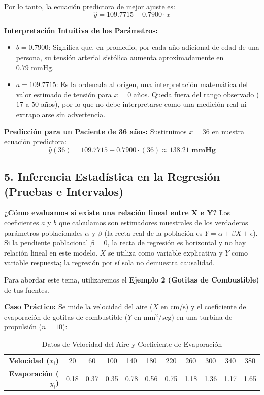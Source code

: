 \documentclass[11pt,a4paper]{article}
\begin{document}
    Por lo tanto, la ecuación predictora de mejor ajuste es:
    \[ \hat{y} = 109.7715 + 0.7900 \cdot x \]

    \textbf{Interpretación Intuitiva de los Parámetros:}
    \begin{itemize}
        \item $b = 0.7900$: Significa que, en promedio, por cada año adicional de edad de una persona, su tensión arterial sistólica aumenta aproximadamente en $0.79 \text{ mmHg}$.
        \item $a = 109.7715$: Es la ordenada al origen, una interpretación matemática del valor estimado de tensión para $x=0$ años. Queda fuera del rango observado ($17$ a $50$ años), por lo que no debe interpretarse como una medición real ni extrapolarse sin advertencia.
    \end{itemize}

    \textbf{Predicción para un Paciente de 36 años:}
    Sustituimos $x = 36$ en nuestra ecuación predictora:
    \[ \hat{y}(36) = 109.7715 + 0.7900 \cdot (36) \approx \mathbf{138.21 \text{ mmHg}} \]
 

\newpage
\subsection{5. Inferencia Estadística en la Regresión (Pruebas e Intervalos)}
    \textbf{¿Cómo evaluamos si existe una relación lineal entre X e Y?} \label{ej:evaporacion_completo}
    Los coeficientes $a$ y $b$ que calculamos son estimadores muestrales de los verdaderos parámetros poblacionales $\alpha$ y $\beta$ (la recta real de la población es $Y = \alpha + \beta X + \epsilon$). Si la pendiente poblacional $\beta = 0$, la recta de regresión es horizontal y no hay relación lineal en este modelo. $X$ se utiliza como variable explicativa y $Y$ como variable respuesta; la regresión por sí sola no demuestra causalidad.

    Para abordar este tema, utilizaremos el \textbf{Ejemplo 2 (Gotitas de Combustible)} de tus fuentes.
    
    \textbf{Caso Práctico:} Se mide la velocidad del aire ($X$ en $\text{cm/s}$) y el coeficiente de evaporación de gotitas de combustible ($Y$ en $\text{mm}^2\text{/seg}$) en una turbina de propulsión ($n = 10$):
    \begin{table}[h!]
        \centering
        \caption{Datos de Velocidad del Aire y Coeficiente de Evaporación}
        \begin{tabular}{rcccccccccc}
            \toprule
            \textbf{Velocidad ($x_i$)} & 20 & 60 & 100 & 140 & 180 & 220 & 260 & 300 & 340 & 380 \\
            \textbf{Evaporación ($y_i$)} & 0.18 & 0.37 & 0.35 & 0.78 & 0.56 & 0.75 & 1.18 & 1.36 & 1.17 & 1.65 \\
            \bottomrule
        \end{tabular}
    \end{table}
\end{document}
